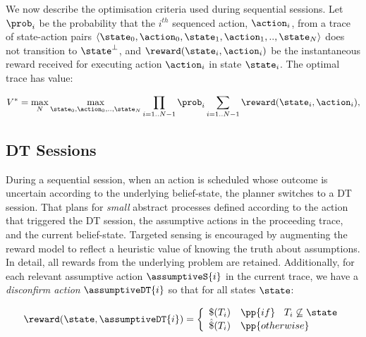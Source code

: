 We now describe the optimisation criteria used during sequential
sessions. Let $\prob_i$ be the probability that the $i^{th}$ sequenced
action, $\action_i$, from a trace of state-action pairs
$\langle \state_0, \action_0,\state_1, \action_1,.., \state_N \rangle$
does not transition to $\state^\bot$, and
$\reward(\state_i, \action_i)$ be the instantaneous reward received
for executing action $\action_i$ in state $\state_i$. The optimal
trace has value:


\tiny
\[
V^* = \max_N \max_{\state_0, \action_0,.., \state_N} \prod_{i=1..N-1} \prob_i \sum_{i=1..N-1}
\reward(\state_i, \action_i),
\]
\normalsize


\subsection{DT Sessions}

During a sequential session, when an action is scheduled whose outcome
is uncertain according to the underlying belief-state, the planner
switches to a DT session. That plans for {\em small} abstract
processes defined according to the action that triggered the DT
session, the assumptive actions in the proceeding trace, and the
current belief-state. Targeted sensing is encouraged by augmenting the
reward model to reflect a heuristic value of knowing the truth about
assumptions. In detail, all rewards from the underlying problem are
retained. Additionally, for each relevant assumptive action
$\assumptiveS{i}$ in the current trace, we have a {\em disconfirm
action} $\assumptiveDT{i}$ so that for all states $\state$:

\vspace{-1ex}
\tiny
\[
\reward(\state, \assumptiveDT{i}) = \bigg\{ \begin{array}{ll}
\$(T_i) & \pp{if}~\;\;T_i \not\subseteq \state \\
\hat\$(T_i) & \pp{otherwise} \\
\end{array}
\]
\normalsize

